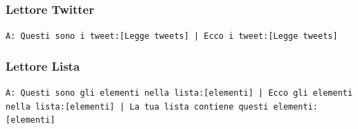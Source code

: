 \subsubsection{Lettore Twitter}
\texttt{A: Questi sono i tweet:[Legge tweets] | Ecco i tweet:[Legge tweets]}\\

\subsubsection{Lettore Lista}
\texttt{A: Questi sono gli elementi nella lista:[elementi] | Ecco gli elementi nella lista:[elementi] | La tua lista contiene questi elementi: [elementi] }\\




